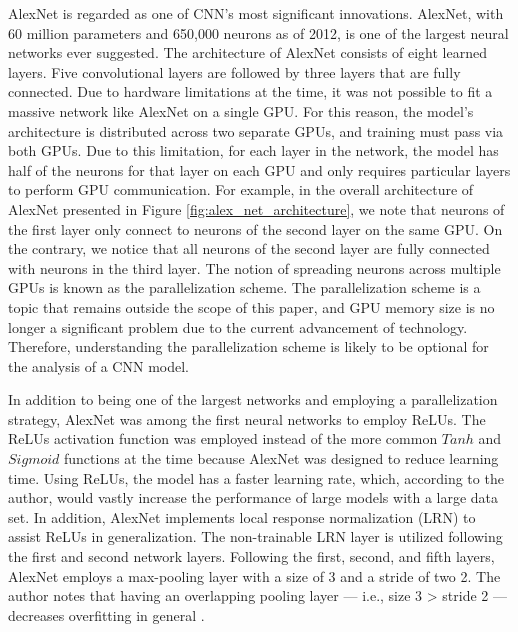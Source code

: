 AlexNet is regarded as one of CNN's most significant innovations. AlexNet, with 60 million parameters and 650,000 neurons as of 2012, is one of the largest neural networks ever suggested. The architecture of AlexNet consists of eight learned layers. Five convolutional layers are followed by three layers that are fully connected. Due to hardware limitations at the time, it was not possible to fit a massive network like AlexNet on a single GPU. For this reason, the model's architecture is distributed across two separate GPUs, and training must pass via both GPUs. Due to this limitation, for each layer in the network, the model has half of the neurons for that layer on each GPU and only requires particular layers to perform GPU communication. For example, in the overall architecture of AlexNet presented in Figure \ref{fig:alex_net_architecture}, we note that neurons of the first layer only connect to neurons of the second layer on the same GPU. On the contrary, we notice that all neurons of the second layer are fully connected with neurons in the third layer. The notion of spreading neurons across multiple GPUs is known as the parallelization scheme. The parallelization scheme is a topic that remains outside the scope of this paper, and GPU memory size is no longer a significant problem due to the current advancement of technology. Therefore, understanding the parallelization scheme is likely to be optional for the analysis of a CNN model.

In addition to being one of the largest networks and employing a parallelization strategy, AlexNet was among the first neural networks to employ ReLUs. The ReLUs activation function was employed instead of the more common $Tanh$ and $Sigmoid$ functions at the time because AlexNet was designed to reduce learning time. Using ReLUs, the model has a faster learning rate, which, according to the author, would vastly increase the performance of large models with a large data set. In addition, AlexNet implements local response normalization (LRN) to assist ReLUs in generalization. The non-trainable LRN layer is utilized following the first and second network layers. Following the first, second, and fifth layers, AlexNet employs a max-pooling layer with a size of 3 and a stride of two 2. The author notes that having an overlapping pooling layer — i.e., size 3 > stride 2 — decreases overfitting in general \cite{AlexNet_2017}.

